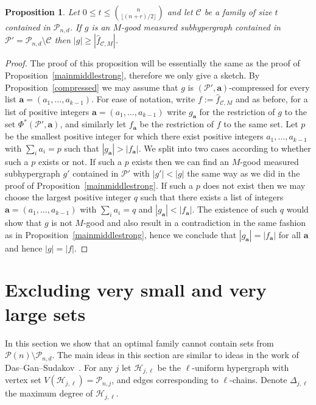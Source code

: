 \documentclass[12pt]{article}
\newtheorem{prop}[theorem]{Proposition}
\numberwithin{equation}{section}
\def\C{\mathcal{C}}
\def\HH{\mathcal{H}}
\def\P{\mathcal{P}}
\begin{document}
\begin{prop}\label{mainmiddlestrong2}
Let $0\leq t\leq \binom{n}{\lfloor(n+r)/2\rfloor}$ and let $\C$ be a family of size $t$ contained in $\P_{n,d}$. If $g$ is an $M$-good measured subhypergraph contained in $\P'=\P_{n,d}\setminus \C$ then $|g|\geq |\hat{f}_{\C,M}|$.
\end{prop}
\begin{proof}
The proof of this proposition will be essentially the same as the proof of Proposition~\ref{mainmiddlestrong}, therefore we only give a sketch.  By Proposition~\ref{compressed} we may assume that $g$ is $(\P',\mathbf{a})$-compressed for every list $\mathbf{a}=(a_1,\ldots,a_{k-1})$. For ease of notation, write $f:=\hat{f}_{\C,M}$ and as before,  for a list of positive integers $\mathbf{a}=(a_1,\ldots,a_{k-1})$ write $g_{\mathbf{a}}$ for the restriction of $g$ to the set $\Phi^*(\P',\mathbf{a})$, and similarly let $f_{\mathbf{a}}$ be the restriction of $f$ to the same set. Let $p$ be the smallest positive integer for which there exist positive integers $a_1,\ldots, a_{k-1}$ with $\sum_i a_i=p$ such that $|g_{\mathbf{a}}|>|f_{\mathbf{a}}|$. We split into two cases according to whether such a $p$ exists or not. If such a $p$ exists then we can find an $M$-good measured subhypergraph $g'$ contained in $\P'$ with $|g'|<|g|$ the same way as we did in the proof of Proposition~\ref{mainmiddlestrong}. If such a $p$ does not exist then we may choose the largest positive integer $q$ such that there exists a list of integers $\mathbf{a}=(a_1,\ldots,a_{k-1})$ with $\sum_i a_i=q$ and $|g_{\mathbf{a}}|< |f_{\mathbf{a}}|$. The existence of such $q$ would show that $g$ is not $M$-good and also result in a contradiction in the same fashion as in Proposition~\ref{mainmiddlestrong}, hence we conclude that $|g_{\mathbf{a}}|=|f_{\mathbf{a}}|$ for all $\mathbf{a}$ and hence $|g|=|f|$.
\end{proof}

\section{Excluding very small and very large sets}\label{smalllargesetssection}

In this section we show that an optimal family cannot contain sets from $\P(n)\setminus \P_{n,d}$. The main ideas in this section are similar to ideas in the work of Das--Gan--Sudakov~\cite{dasgansuda}. For any $j$ let $\HH_{j,\ell}$ be the $\ell$-uniform hypergraph with vertex set $V(\HH_{j,\ell})=\P_{n,j}$, and edges corresponding to $\ell$-chains. Denote $\Delta_{j,\ell}$ the maximum degree of $\HH_{j,\ell}$.
\end{document}

